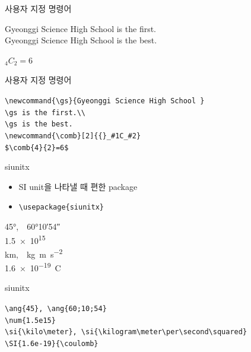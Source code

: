 \documentclass[12pt]{gshs_lecture}
\newcommand{\tb}{\textbackslash}
\newenvironment{codeblock}[1]{
	\begin{block}{#1}
		\setstretch{1.0}
		\begin{small}
}{
		\end{small}
	\end{block}
}
\begin{document}
\begin{frame}[t]{사용자 지정 명령어}
	\begin{center}
		Gyeonggi Science High School is the first.\\
		Gyeonggi Science High School is the best. \\
	\end{center}
	
	\begin{center}
		${}_{4}C_{2}=6$
	\end{center}
	
	\begin{codeblock}{사용자 지정 명령어}
		\texttt{\tb newcommand\{\tb gs\}\{Gyeonggi Science High School \}}\\
		\texttt{\tb gs is the first.\tb\tb \\
			\tb gs is the best.} \\
		
		\texttt{\tb newcommand\{\tb comb\}[2]\{\{\}\_\#1C\_\#2\}}\\
		\texttt{\$\tb comb\{4\}\{2\}=6\$}
	\end{codeblock}
\end{frame}

\begin{frame}[t]{siunitx}
	\begin{itemize}
		\item SI unit을 나타낼 때 편한 package
		\item \texttt{\tb usepackage\{siunitx\}}
	\end{itemize}
	
	\begin{center}
		\ang{45},\ \ \ang{60;10;54}\\
		\num{1.5e15}\\
		\si{\kilo\meter},\ \ \si{\kilogram\meter\per\second\squared}\\
		\SI{1.6e-19}{\coulomb}
	\end{center}
	
	\begin{codeblock}{siunitx}
		\texttt{\tb ang\{45\}, \tb ang\{60;10;54\}\\
			\tb num\{1.5e15\}\\
			\tb si\{\tb kilo\tb meter\}, \tb si\{\tb kilogram\tb meter\tb per\tb second\tb squared\}\\
			\tb SI\{1.6e-19\}\{\tb coulomb\}}
	\end{codeblock}
\end{frame}
\end{document}
